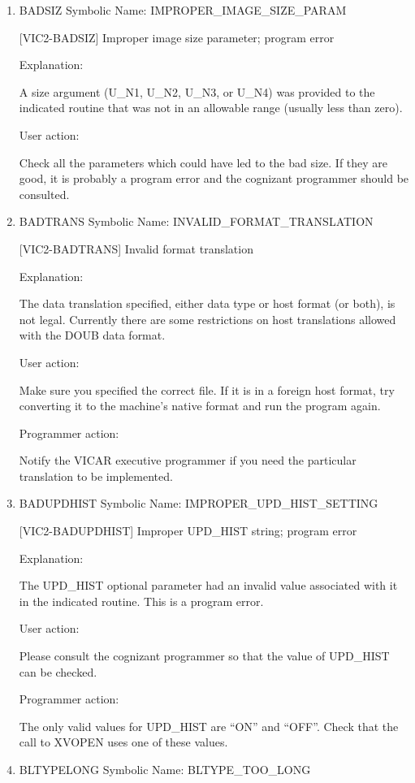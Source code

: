 \begin{enumerate}
\item BADSIZ Symbolic Name: IMPROPER\_IMAGE\_SIZE\_PARAM

[VIC2-BADSIZ] Improper image size parameter; program error

Explanation:

A size argument (U\_N1, U\_N2, U\_N3, or U\_N4) was provided to the
indicated routine that was not in an allowable range
(usually less than zero).

User action:

Check all the parameters which could have led to the bad size.
If they are good, it is probably a program error and the cognizant
programmer should be consulted.


\item BADTRANS Symbolic Name: INVALID\_FORMAT\_TRANSLATION

[VIC2-BADTRANS] Invalid format translation

Explanation:

The data translation specified, either data type or host
format (or both), is not legal.  Currently there are some
restrictions on host translations allowed with the DOUB data format.

User action:

Make sure you specified the correct file.  If it is in a foreign
host format, try converting it to the machine's native format
and run the program again.

Programmer action:

Notify the VICAR executive programmer if you need the particular
translation to be implemented.


\item BADUPDHIST Symbolic Name: IMPROPER\_UPD\_HIST\_SETTING

[VIC2-BADUPDHIST] Improper UPD\_HIST string; program error

Explanation:

The UPD\_HIST optional parameter had an invalid value
associated with it in the indicated routine.  This is a program error.

User action:

Please consult the cognizant programmer so that the value of
UPD\_HIST can be checked.

Programmer action:

The only valid values for UPD\_HIST are ``ON'' and ``OFF''.
Check that the call to XVOPEN uses one of these values.


\item BLTYPELONG Symbolic Name: BLTYPE\_TOO\_LONG


\end{enumerate}
